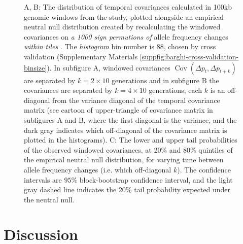 \documentclass[11pt]{article}
\newcommand{\gc}[1]{{\it \color{red} #1 } }
\DeclareMathOperator{\cov}{Cov}
\begin{document}
\begin{figure}[!ht]
  \caption{A, B: The distribution of temporal covariances calculated in 100kb
    genomic windows from the \textcite{Barghi2019-qy} study, plotted alongside
    an empirical neutral null distribution created by recalculating the
    windowed covariances on \gc{a 1000 sign permutions of} allele
    frequency changes \gc{within tiles}. The
    \gc{histogram} bin number is 88, chosen by cross validation (Supplementary Materials
    \ref{suppfig:barghi-cross-validation-binsize}). In subfigure A, windowed
    covariances $\cov(\Delta p_t, \Delta p_{t+k})$ are separated by $k=2 \times
    10$ generations and in subfigure B the covariances are separated by $k=4
    \times 10$ generations; each $k$ is an off-diagonal from the variance
    diagonal of the temporal covariance matrix (see cartoon of upper-triangle
    of covariance matrix in subfigures A and B, where the first diagonal is the
    variance, and the dark gray indicates which off-diagonal of the covariance
    matrix is plotted in the histograms). C: The lower and upper tail
    probabilities of the observed windowed covariances, at 20\% and 80\%
    quintiles of the empirical neutral null distribution, for varying time
    between allele frequency changes (i.e. which off-diagonal $k$). The
  confidence intervals are  $95\%$ block-bootstrap confidence interval, and the
light gray dashed line indicates the 20\% tail probability expected under the
neutral null.}
  
    \label{fig:figure-3} 
\end{figure}

\section{Discussion}
\end{document}

